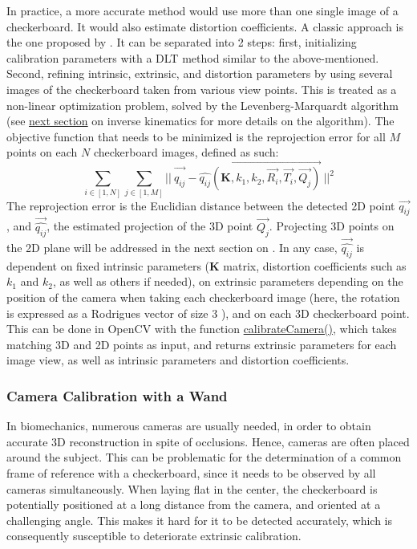 In practice, a more accurate method would use more than one single image of a checkerboard. It would also estimate distortion coefficients. A classic approach is the one proposed by \cite{Zhang2000}. It can be separated into 2 steps: first, initializing calibration parameters with a DLT method similar to the above-mentioned. Second, refining intrinsic, extrinsic, and distortion parameters by using several images of the checkerboard taken from various view points. This is treated as a non-linear optimization problem, solved by the Levenberg-Marquardt algorithm \cite{Marquardt1963,More1978} (see \hyperref[levenberg]{next section} on inverse kinematics for more details on the algorithm). The objective function that needs to be minimized is the reprojection error for all $M$ points on each $N$ checkerboard images, defined as such:
\begin{equation}\label{eq:LM_algo}
  \sum_{i \in [1,N]} \sum_{j \in [1,M]} 
  ||\ \overrightarrow{q_{ij}^{\ ^{\ ^{\ ^{\ }}}}} -
  \overrightarrow{\widehat{q_{ij}}(\textbf{K},k_1,k_2,\overrightarrow{R_i},\overrightarrow{T_i},\overrightarrow{Q_j})}\ 
  ||^2
\end{equation} 
The reprojection error is the Euclidian distance between the detected 2D point $\overrightarrow{q_{ij}}$, and $\overrightarrow{\widehat{q_{ij}}}$, the estimated projection of the 3D point $\overrightarrow{Q_j}$. Projecting 3D points on the 2D plane will be addressed in the next section on . In any case, $\overrightarrow{\widehat{q_{ij}}}$ is dependent on fixed intrinsic parameters (\textbf{K} matrix, distortion coefficients such as $k_1$ and $k_2$, as well as others if needed), on extrinsic parameters depending on the position of the camera when taking each checkerboard image (here, the rotation is expressed as a Rodrigues vector of size 3 \cite{Gallego2015}), and on each 3D checkerboard point. This can be done in OpenCV with the function \href{https://docs.opencv.org/4.x/d9/d0c/group__calib3d.html#ga3207604e4b1a1758aa66acb6ed5aa65d}{calibrateCamera()}, which takes matching 3D and 2D points as input, and returns extrinsic parameters for each image view, as well as intrinsic parameters and distortion coefficients.

\subsubsection{Camera Calibration with a Wand} 

In biomechanics, numerous cameras are usually needed, in order to obtain accurate 3D reconstruction in spite of occlusions. Hence, cameras are often placed around the subject. This can be problematic for the determination of a common frame of reference with a checkerboard, since it needs to be observed by all cameras simultaneously. When laying flat in the center, the checkerboard is potentially positioned at a long distance from the camera, and oriented at a challenging angle. This makes it hard for it to be detected accurately, which is consequently susceptible to deteriorate extrinsic calibration. 


